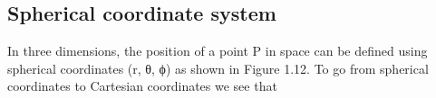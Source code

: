 
\subsection{Spherical coordinate system}
In three dimensions, the position of a point P in space can be defined using spherical coordinates (r, θ, ϕ) as shown in Figure 1.12. To go from spherical coordinates to Cartesian coordinates we see that



